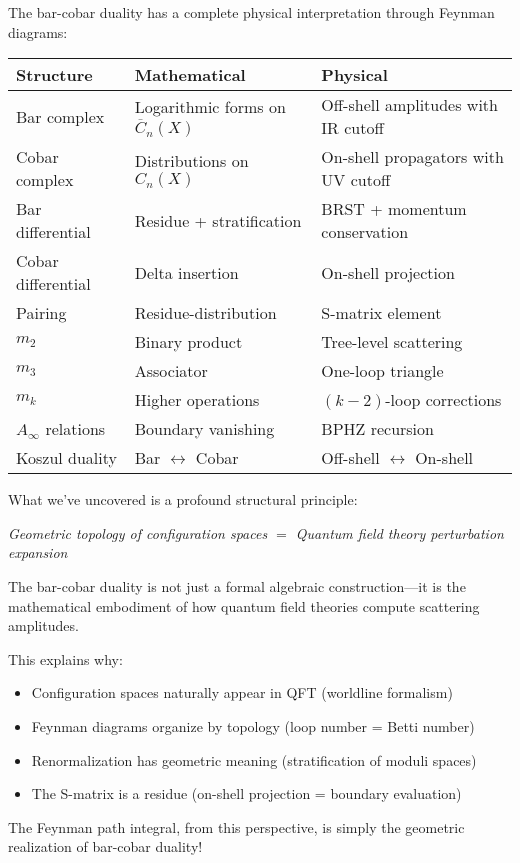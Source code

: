 \begin{remark}[Summary]
The bar-cobar duality has a complete physical interpretation through Feynman 
diagrams:

\begin{center}
\begin{tabular}{|l|p{5cm}|p{5cm}|}
\hline
\textbf{Structure} & \textbf{Mathematical} & \textbf{Physical} \\
\hline
Bar complex & Logarithmic forms on $\overline{C}_n(X)$ & Off-shell amplitudes 
with IR cutoff \\
\hline
Cobar complex & Distributions on $C_n(X)$ & On-shell propagators with UV cutoff \\
\hline
Bar differential & Residue + stratification & BRST + momentum conservation \\
\hline
Cobar differential & Delta insertion & On-shell projection \\
\hline
Pairing & Residue-distribution & S-matrix element \\
\hline
$m_2$ & Binary product & Tree-level scattering \\
\hline
$m_3$ & Associator & One-loop triangle \\
\hline
$m_k$ & Higher operations & $(k-2)$-loop corrections \\
\hline
$A_\infty$ relations & Boundary vanishing & BPHZ recursion \\
\hline
Koszul duality & Bar $\leftrightarrow$ Cobar & Off-shell $\leftrightarrow$ On-shell \\
\hline
\end{tabular}
\end{center}
\end{remark}

\begin{remark}
What we've uncovered is a profound structural principle:

\begin{center}
\textit{Geometric topology of configuration spaces $=$ Quantum field theory 
perturbation expansion}
\end{center}

The bar-cobar duality is not just a formal algebraic construction—it is the 
mathematical embodiment of how quantum field theories compute scattering amplitudes.

This explains why:
\begin{itemize}
\item Configuration spaces naturally appear in QFT (worldline formalism)
\item Feynman diagrams organize by topology (loop number = Betti number)
\item Renormalization has geometric meaning (stratification of moduli spaces)
\item The S-matrix is a residue (on-shell projection = boundary evaluation)
\end{itemize}

The Feynman path integral, from this perspective, is simply the geometric 
realization of bar-cobar duality!
\end{remark}

